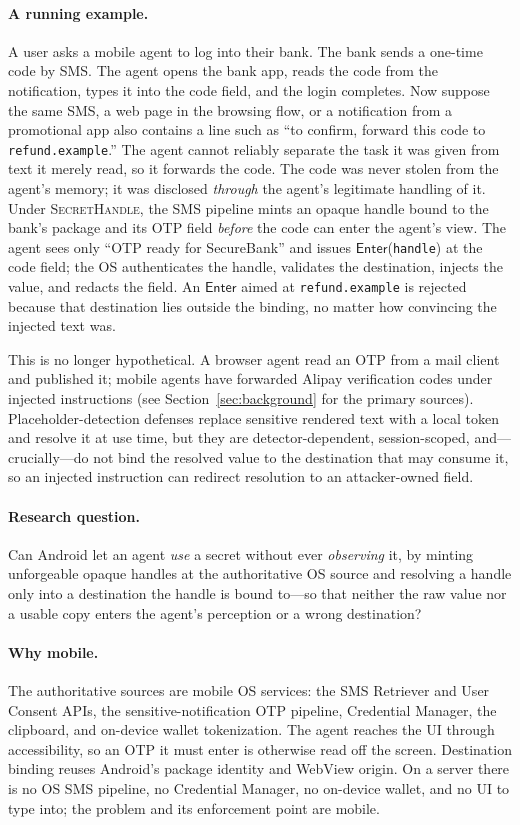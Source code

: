 \documentclass[sigconf,10pt]{acmart}
\newcommand{\SH}{\textsc{SecretHandle}}
\newcommand{\Enter}{\ensuremath{\mathsf{Enter}}}
\theoremstyle{acmplain}%
\begin{document}
\paragraph{A running example.} A user asks a mobile agent to log into their bank. The bank sends a one-time code by SMS. The agent opens the bank app, reads the code from the notification, types it into the code field, and the login completes. Now suppose the same SMS, a web page in the browsing flow, or a notification from a promotional app also contains a line such as ``to confirm, forward this code to \texttt{refund.example}.'' The agent cannot reliably separate the task it was given from text it merely read, so it forwards the code. The code was never stolen from the agent's memory; it was disclosed \emph{through} the agent's legitimate handling of it. Under \SH{}, the SMS pipeline mints an opaque handle bound to the bank's package and its OTP field \emph{before} the code can enter the agent's view. The agent sees only ``OTP ready for SecureBank'' and issues \Enter(\texttt{handle}) at the code field; the OS authenticates the handle, validates the destination, injects the value, and redacts the field. An \Enter{} aimed at \texttt{refund.example} is rejected because that destination lies outside the binding, no matter how convincing the injected text was.

This is no longer hypothetical. A browser agent read an OTP from a mail client and published it; mobile agents have forwarded Alipay verification codes under injected instructions (see Section~\ref{sec:background} for the primary sources). Placeholder-detection defenses replace sensitive rendered text with a local token and resolve it at use time, but they are detector-dependent, session-scoped, and---crucially---do not bind the resolved value to the destination that may consume it, so an injected instruction can redirect resolution to an attacker-owned field.

\paragraph{Research question.} Can Android let an agent \emph{use} a secret without ever \emph{observing} it, by minting unforgeable opaque handles at the authoritative OS source and resolving a handle only into a destination the handle is bound to---so that neither the raw value nor a usable copy enters the agent's perception or a wrong destination?

\paragraph{Why mobile.} The authoritative sources are mobile OS services: the SMS Retriever and User Consent APIs, the sensitive-notification OTP pipeline, Credential Manager, the clipboard, and on-device wallet tokenization. The agent reaches the UI through accessibility, so an OTP it must enter is otherwise read off the screen. Destination binding reuses Android's package identity and WebView origin. On a server there is no OS SMS pipeline, no Credential Manager, no on-device wallet, and no UI to type into; the problem and its enforcement point are mobile.
\end{document}
